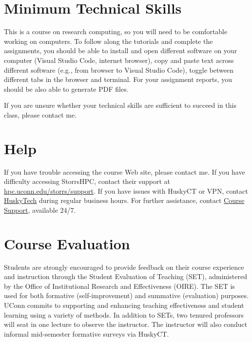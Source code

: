 \documentclass[11pt]{article}
\begin{document}
\section*{Minimum Technical Skills}
This is a course on research computing, so you will need to be comfortable working on computers.  To follow along the tutorials and complete the assignments, you should be able to install and open different software on your computer (Visual Studio Code, internet browser),  copy and paste text across different software (e.g., from browser to Visual Studio Code), toggle between different tabs in the browser and terminal. For your assignment reports, you should be also able to generate PDF files. 

If you are unsure whether your technical skills are sufficient to succeed in this class, please contact me.

\section*{Help}

If you have trouble accessing the course Web site,  please contact me. If you have difficulty accessing StorrsHPC, contact their support at \href{https://hpc.uconn.edu/storrs/support/#}{hpc.uconn.edu/storrs/support}. If you have issues with HuskyCT or VPN, contact \href{https://techsupport.uconn.edu}{HuskyTech} during regular business hours. For further assistance, contact \href{https://students.uconn.edu/academic-support-services/}{Course Support}, available 24/7.

\section*{Course Evaluation}
Students are strongly encouraged to provide feedback on their course experience
and instruction through the Student Evaluation of Teaching (SET), administered by the Office of Institutional Research and Effectiveness (OIRE).  The SET is used for both formative (self-improvement) and summative (evaluation) purposes.  UConn commits to supporting and enhancing teaching effectiveness and student learning using a variety of methods.  In addition to SETs, two tenured professors will seat in one lecture to observe the instructor. The instructor will also conduct informal mid-semester formative surveys via HuskyCT.
\end{document}
